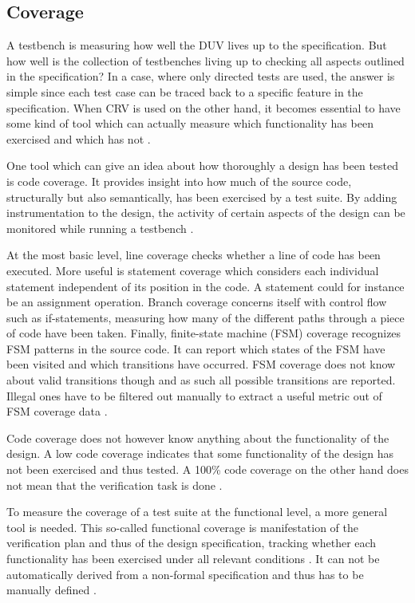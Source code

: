 \documentclass[11pt,a4paper]{report}
\begin{document}
\subsection{Coverage} %

A testbench is measuring how well the DUV lives up to the specification. But how well is the collection of
testbenches living up to checking all aspects outlined in the specification? In a case, where only directed tests are
used, the answer is simple since each test case can be traced back to a specific feature in the specification. When
CRV is used on the other hand, it becomes essential to have some kind of tool which can actually measure which
functionality has been exercised and which has not \cite[Ch. 15]{mehta2021introduction}.

One tool which can give an idea about how thoroughly a design has been tested is code coverage. It provides insight
into how much of the source code, structurally but also semantically, has been exercised by a test suite. By adding
instrumentation to the design, the activity of certain aspects of the design can be monitored while running a
testbench \cite[Ch. 2]{bergeron2012writing}.

At the most basic level, line coverage checks whether a line of code has been executed. More useful is statement
coverage which considers each individual statement independent of its position in the code. A statement could for
instance be an assignment operation. Branch coverage concerns itself with control flow such as if-statements,
measuring how many of the different paths through a piece of code have been taken. Finally, finite-state machine
(FSM) coverage recognizes FSM patterns in the source code. It can report which states of the FSM have been visited
and which transitions have occurred. FSM coverage does not know about valid transitions though and as such all
possible transitions are reported. Illegal ones have to be filtered out manually to extract a useful metric out of
FSM coverage data \cite[Ch. 15]{mehta2021introduction}.

Code coverage does not however know anything about the functionality of the design. A low code coverage indicates that
some functionality of the design has not been exercised and thus tested. A 100\% code coverage on the other hand does
not mean that the verification task is done \cite[Ch. 2]{bergeron2012writing}.

To measure the coverage of a test suite at the functional level, a more general tool is needed. This so-called
functional coverage is manifestation of the verification plan and thus of the design specification, tracking whether
each functionality has been exercised under all relevant conditions \cite[Sec. 7.6]{flake2020a}. It can not be
automatically derived from a non-formal specification and thus has to be manually defined \cite[Ch. 15]{mehta2021introduction}.
\end{document}
